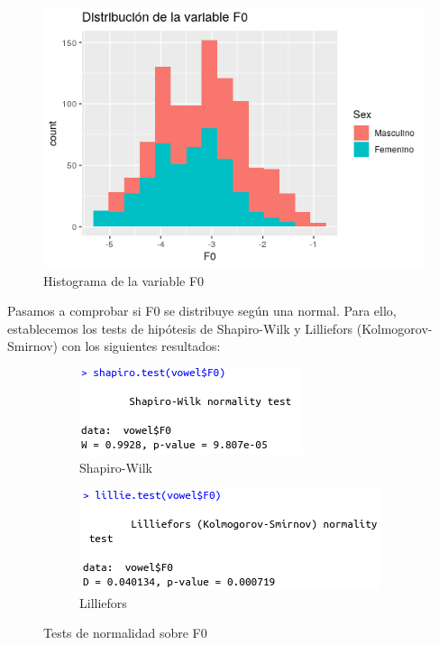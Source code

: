 \begin{figure}[H] %
	\centering
	\includegraphics[scale=0.6]{dist-F0.png}  %
	\caption{Histograma de la variable F0} 
	\label{fig:hist-F0}
\end{figure}

Pasamos a comprobar si F0 se distribuye según una normal. Para ello, establecemos los tests de hipótesis de Shapiro-Wilk y Lilliefors (Kolmogorov-Smirnov) con los siguientes resultados:

\begin{figure}[H]
	\centering
	\begin{subfigure}{.5\textwidth}
		\centering
		\includegraphics[width=.7\linewidth]{sw-F0.png}
		\caption{Shapiro-Wilk}
		\label{fig:sw-F0}
	\end{subfigure}%
	\begin{subfigure}{.5\textwidth}
		\centering
		\includegraphics[width=.7\linewidth]{l-F0.png}
		\caption{Lilliefors}
		\label{fig:l-F0}
	\end{subfigure}
	\caption{Tests de normalidad sobre F0}
	\label{fig:normF0}
\end{figure}

